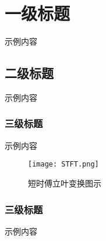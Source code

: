 \chapter{一级标题}
示例内容

\section{二级标题}
示例内容
\subsection{三级标题}
示例内容
\begin{figure}[ht]
    \begin{center}
                    
            \texttt{[image: STFT.png]}
            \caption{短时傅立叶变换图示}
    
    \end{center} 
\end{figure}

\subsection{三级标题}
示例内容
